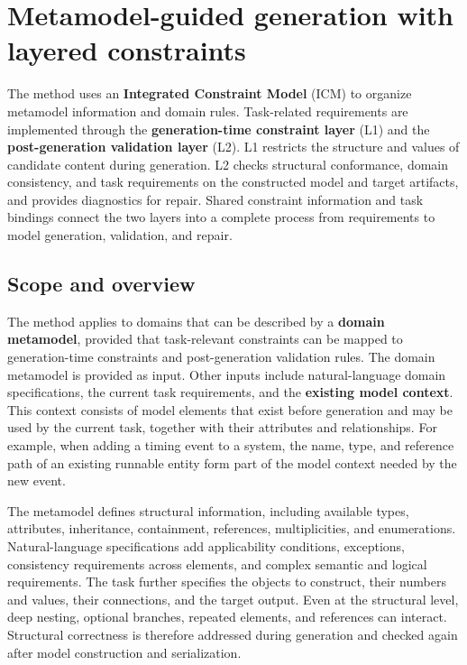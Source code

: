 \documentclass[pdflatex,iicol,sn-mathphys-num]{sn-jnl}
\begin{document}
\section{Metamodel-guided generation with layered constraints}\label{sec:method}

The method uses an \textbf{Integrated Constraint Model} (ICM) to organize metamodel information and domain rules. Task-related requirements are implemented through the \textbf{generation-time constraint layer} (L1) and the \textbf{post-generation validation layer} (L2). L1 restricts the structure and values of candidate content during generation. L2 checks structural conformance, domain consistency, and task requirements on the constructed model and target artifacts, and provides diagnostics for repair. Shared constraint information and task bindings connect the two layers into a complete process from requirements to model generation, validation, and repair.


\subsection{Scope and overview}\label{sec:method-3-1}

The method applies to domains that can be described by a \textbf{domain metamodel}, provided that task-relevant constraints can be mapped to generation-time constraints and post-generation validation rules. The domain metamodel is provided as input. Other inputs include natural-language domain specifications, the current task requirements, and the \textbf{existing model context}. This context consists of model elements that exist before generation and may be used by the current task, together with their attributes and relationships. For example, when adding a timing event to a system, the name, type, and reference path of an existing runnable entity form part of the model context needed by the new event.


The metamodel defines structural information, including available types, attributes, inheritance, containment, references, multiplicities, and enumerations. Natural-language specifications add applicability conditions, exceptions, consistency requirements across elements, and complex semantic and logical requirements. The task further specifies the objects to construct, their numbers and values, their connections, and the target output. Even at the structural level, deep nesting, optional branches, repeated elements, and references can interact. Structural correctness is therefore addressed during generation and checked again after model construction and serialization.
\end{document}
